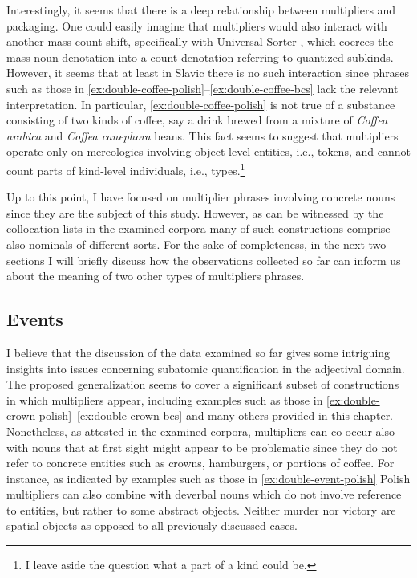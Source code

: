 Interestingly, it seems that there is a deep relationship between multipliers and packaging. One could easily imagine that multipliers would also interact with another mass-count shift, specifically with Universal Sorter \citep[see][]{bunt1985mass}, which coerces the mass noun denotation into a count denotation referring to quantized subkinds. However, it seems that at least in Slavic there is no such interaction since phrases such as those in \ref{ex:double-coffee-polish}--\ref{ex:double-coffee-bcs} lack the relevant interpretation. In particular, \ref{ex:double-coffee-polish} is not true of a substance consisting of two kinds of coffee, say a drink brewed from a mixture of \textit{Coffea arabica} and \textit{Coffea canephora} beans. This fact seems to suggest that multipliers operate only on mereologies involving object-level entities, i.e., tokens, and cannot count parts of kind-level individuals, i.e., types.\footnote{I leave aside the question what a part of a kind could be.}

Up to this point, I have focused on multiplier phrases involving concrete nouns since they are the subject of this study. However, as can be witnessed by the collocation lists in the examined corpora many of such constructions comprise also nominals of different sorts. For the sake of completeness, in the next two sections I will briefly discuss how the observations collected so far can inform us about the meaning of two other types of multipliers phrases.

\subsection{Events}\label{sec:events}

I believe that the discussion of the data examined so far gives some intriguing insights into issues concerning subatomic quantification in the adjectival domain. The proposed generalization seems to cover a significant subset of constructions in which multipliers appear, including examples such as those in \ref{ex:double-crown-polish}--\ref{ex:double-crown-bcs} and many others provided in this chapter. Nonetheless, as attested in the examined corpora, multipliers can co-occur also with nouns that at first sight might appear to be problematic since they do not refer to concrete entities such as crowns, hamburgers, or portions of coffee. For instance, as indicated by examples such as those in \ref{ex:double-event-polish} Polish multipliers can also combine with deverbal nouns which do not involve reference to entities, but rather to some abstract objects. Neither murder nor victory are spatial objects as opposed to all previously discussed cases.

